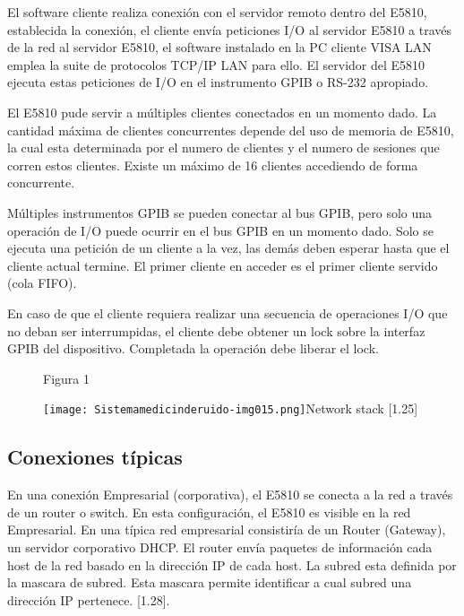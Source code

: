 \documentclass[paper=letter,oneside,fontsize=10pt,parskip=full]{article}
\begin{document}
El software cliente realiza conexión con el servidor remoto dentro del E5810, establecida la conexión, el cliente envía
peticiones I/O al servidor E5810 a través de la red al servidor E5810, el software instalado en la PC cliente VISA LAN
emplea la suite de protocolos TCP/IP LAN para ello. El servidor del E5810 ejecuta estas peticiones de I/O en el
instrumento GPIB o RS-232 apropiado.

El E5810 pude servir a múltiples clientes conectados en un momento dado. La cantidad máxima de clientes concurrentes
depende del uso de memoria de E5810, la cual esta determinada por el numero de clientes y el numero de sesiones que
corren estos clientes. Existe un máximo de 16 clientes accediendo de forma concurrente.

Múltiples instrumentos GPIB se pueden conectar al bus GPIB, pero solo una operación de I/O puede ocurrir en el bus GPIB
en un momento dado. Solo se ejecuta una petición de un cliente a la vez, las demás deben esperar hasta que el cliente
actual termine. El primer cliente en acceder es el primer cliente servido (cola FIFO).

En caso de que el cliente requiera realizar una secuencia de operaciones I/O que no deban ser interrumpidas, el cliente
debe obtener un lock sobre la interfaz GPIB del dispositivo. Completada la operación debe liberar el lock.


\bigskip



\begin{figure}
\centering
\begin{minipage}{11.501cm}
Figura 1

\texttt{[image: Sistemamedicinderuido-img015.png]}Network stack [1.25]
\end{minipage}
\end{figure}
\subsection[Conexiones típicas]{Conexiones típicas}
En una conexión Empresarial (corporativa), el E5810 se conecta a la red a través de un router o switch. En esta
configuración, el E5810 es visible en la red Empresarial. En una típica red empresarial consistiría de un Router
(Gateway), un servidor corporativo DHCP. El router envía paquetes de información cada host de la red basado en la
dirección IP de cada host. La subred esta definida por la mascara de subred. Esta mascara permite identificar a cual
subred una dirección IP pertenece. [1.28].
\end{document}
